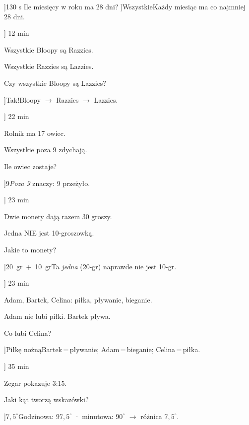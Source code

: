 
\ExerciseSlide[\CategoryBadge[LogicColor!20]{Pu\l{}apka}]{1}{30 s}{%
    Ile miesi\k{e}cy w roku ma 28 dni?
  }
\AnswerSlide[\CategoryBadge[LogicColor!20]{Pu\l{}apka}]{Wszystkie}{Ka\. zdy miesi\k{a}c ma co najmniej 28 dni.}

\ExerciseSlide[\CategoryBadge[LogicColor!20]{Sylogizm}]
  {1}{2 min}{%
    Wszystkie Bloopy są Razzies.\par
    Wszystkie Razzies są Lazzies.\par
    Czy wszystkie Bloopy są Lazzies?
  }
\AnswerSlide[\CategoryBadge[LogicColor!20]{Sylogizm}]{Tak!}{Bloopy $\to$ Razzies $\to$ Lazzies.}

\ExerciseSlide[\CategoryBadge[LogicColor!20]{Pu\l{}apka}]
  {2}{2 min}{%
    Rolnik ma 17 owiec.\par
    Wszystkie poza 9 zdychaj\k{a}.\par
    Ile owiec zostaje?
  }
\AnswerSlide[\CategoryBadge[LogicColor!20]{Pu\l{}apka}]{9}{\emph{Poza 9} znaczy: 9 prze\. zy\l{}o.}

\ExerciseSlide[\CategoryBadge[LogicColor!20]{Pu\l{}apka}]
  {2}{3 min}{%
    Dwie monety daj\k{a} razem 30 groszy.\par
    Jedna NIE jest 10-groszowk\k{a}.\par
    Jakie to monety?
  }
\AnswerSlide[\CategoryBadge[LogicColor!20]{Pu\l{}apka}]{20~gr~+~10~gr}{Ta \emph{jedna} (20-gr) naprawde nie jest 10-gr.}

\ExerciseSlide[\CategoryBadge[LogicColor!20]{Dedukcja}]
  {2}{3 min}{%
    Adam, Bartek, Celina: pi\l{}ka, p\l{}ywanie, bieganie.\par
    Adam nie lubi pi\l{}ki. Bartek p\l{}ywa.\par
    Co lubi Celina?
  }
\AnswerSlide[\CategoryBadge[LogicColor!20]{Dedukcja}]{Pi\l{}k\k{e} no\. zn\k{a}}{Bartek\,=\,p\l{}ywanie; Adam\,=\,bieganie; Celina\,=\,pi\l{}ka.}

\ExerciseSlide[\CategoryBadge[LogicColor!20]{Geometria}]
  {3}{5 min}{%
    Zegar pokazuje 3:15.\par
    Jaki k\k{a}t tworz\k{a} wskaz\'{o}wki?
  }
\AnswerSlide[\CategoryBadge[LogicColor!20]{Geometria}]{$7{,}5^\circ$}{Godzinowa: $97{,}5^\circ$ · minutowa: $90^\circ$ $\to$ r\'{o}\. znica $7{,}5^\circ$.}

